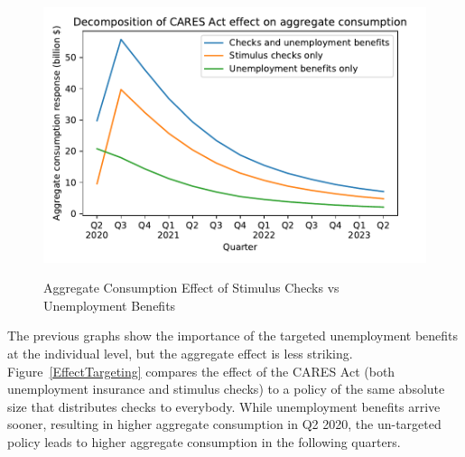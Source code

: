 \documentclass[titlepage]{\econtex}
\begin{document}
\begin{figure}
  \centering
  \caption{Aggregate Consumption Effect of Stimulus Checks vs Unemployment Benefits}
  \label{checks_vs_unemp}
  { \includegraphics[width=8in]{./Figures/Checks_vs_Unemp}}
\end{figure}

The previous graphs show the importance of the targeted unemployment benefits at the individual level, but the aggregate effect is less striking.
Figure~\ref{EffectTargeting} compares the effect of the CARES Act (both unemployment insurance and stimulus checks) to a policy of the same absolute size that distributes checks to everybody.
While unemployment benefits arrive sooner, resulting in higher aggregate consumption in Q2 2020, the un-targeted policy leads to higher aggregate consumption in the following quarters.
\end{document}
